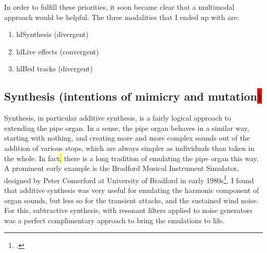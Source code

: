 \documentclass[12pt,twoside,maitrise]{dms_ks}
\theoremstyle{definition}
\begin{document}
{In order to fulfill these priorities, it soon became clear that a multimodal approach would be helpful. The three modalities that I ended up with are:

\begin{enumerate}
  \item hl{Synthesis (divergent)}
  
  \item hl{Live effects (convergent)}
  
  \item hl{Bed tracks (divergent)}
\end{enumerate}

\subsection{Synthesis (intentions of mimicry and mutation\colorbox{red}{)}}

Synthesis, in particular additive synthesis, is a fairly logical approach to extending the pipe organ. 
In a sense, the pipe organ behaves in a similar way, starting with nothing, and creating more and more complex sounds out of the addition of various stops, which are always simpler as individuals than taken in the whole. 
In fact\hl{,} there is a long tradition of emulating the pipe organ this way. 
A prominent early example is the Bradford Musical Instrument Simulator, designed by Peter Comerford at University of Bradford in early 1980s\footcite[61]{comerford_simulating_1993}. 
I found that additive synthesis was very useful for emulating the harmonic component of organ sounds, but less so for the transient attacks, and the sustained wind noise. 
For this, subtractive synthesis, with resonant filters applied to noise generators was a perfect complimentary approach to bring the emulations to life.


}
\end{document}
